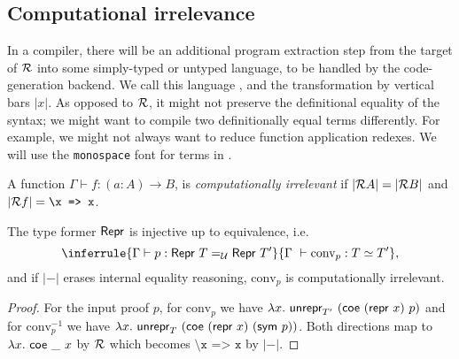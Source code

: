 \subsection{Computational irrelevance}\label{sub:irr}

In a compiler, there will be an additional program extraction step from the
target of $\mathcal{R}$ into some simply-typed or untyped language, to be handled by the
code-generation backend. We call this language \lambdaprog, and the transformation by
vertical bars $|x|$. As opposed to $\mathcal{R}$, it might not preserve the definitional
equality of the syntax; we might want to compile two definitionally equal terms
differently. For example, we might not always want to reduce function
application redexes. We will use the \texttt{monospace} font for terms in
\lambdaprog.

\newcommand{\Pid}{\ensuremath{\texttt{\textbackslash x => x}}}

\begin{definition}
    A function $\Gamma \vdash f : (a : A) \to B$, is \emph{computationally irrelevant} if
    $|\mathcal{R} A| = |\mathcal{R} B|$ and $|\R f| = \Pid$.
\end{definition}

\begin{theorem}
  \label{thm:repr-inj}
	The type former $\textsf{Repr}{}$ is injective up to equivalence, i.e.
	\begin{equation}
	\inferrule{\Gamma \vdash p : \MRepr\ T =_{\univ} \MRepr\ T'}{\Gamma\ \vdash \text{conv}_p : T \simeq T'},
	\end{equation}
	 and if $|-|$ erases internal equality reasoning, $\text{conv}_p$ is computationally irrelevant.
	\begin{proof}
	For the input proof $p$, for $\text{conv}_p$ we have
	$\lambda x.\ \Munrepr_{T'}\ (\mta{coe}\ (\Mrepr\ x)\ p)$
	and for $\text{conv}_p^{-1}$ we have
	$\lambda x.\ \Munrepr_{T}\ (\mta{coe}\ (\Mrepr\ x)\ (\mta{sym}\
	p))$. Both directions map to $\lambda x.\ \textsf{coe}\ \_\ x$ by $\mathcal{R}$ which becomes \Pid{} by $|-|$.
	\end{proof}
\end{theorem}

